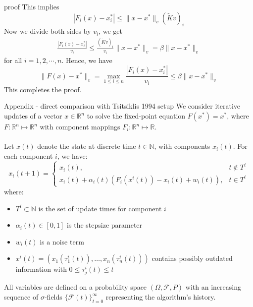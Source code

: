 \documentclass[aspectratio=169]{beamer} %
\begin{document}
\begin{frame}{proof}
This implies
    $$
    |F_i(x)-x^*_i|\le\|x-x^*\|_v(\tilde Kv)_i
    $$
    Now we divide both sides by $v_i$, we get
    \begin{align*}
        \frac{|F_i(x)-x^*_i|}{v_i}\le \frac{(\tilde Kv)_i}{v_i} \|x-x^*\|_v= \beta \|x-x^*\|_v
    \end{align*}
    for all $i=1,2,\cdots, n$. Hence, we have
    $$
    \|F(x)-x^*\|_v = \max_{1\le i \le n}\frac{|F_i(x)-x^*_i|}{v_i} \le\beta \|x-x^*\|_v
    $$
    This completes the proof.
    
\end{frame}
\begin{frame}{Appendix - direct comparison with Tsitsiklis 1994 setup}
    We consider iterative updates of a vector $x \in \mathbb{R}^n$ to solve the fixed-point equation $F(x^*) = x^*$, where $F: \mathbb{R}^n \mapsto \mathbb{R}^n$ with component mappings $F_i: \mathbb{R}^n \mapsto \mathbb{R}$.\\
\\
Let $x(t)$ denote the state at discrete time $t \in \mathbb{N}$, with components $x_i(t)$. For each component $i$, we have:
\begin{equation}\label{eq:update_rule_tsi}
x_i(t + 1) = 
\begin{cases}
x_i(t), & t \notin T^i \\
x_i(t) + \alpha_i(t)(F_i(x^i(t)) - x_i(t) + w_i(t)), & t \in T^i
\end{cases}
\end{equation}
where:
\begin{itemize}
\item $T^i \subset \mathbb{N}$ is the set of update times for component $i$
\item $\alpha_i(t) \in [0,1]$ is the stepsize parameter
\item $w_i(t)$ is a noise term
\item $x^i(t) = (x_1(\tau_1^i(t)), \ldots, x_n(\tau_n^i(t)))$ contains possibly outdated information with $0 \leq \tau_j^i(t) \leq t$
\end{itemize}
All variables are defined on a probability space $(\Omega, \mathcal{F}, P)$ with an increasing sequence of $\sigma$-fields $\{\mathcal{F}(t)\}_{t=0}^{\infty}$ representing the algorithm's history.
\end{frame}
\end{document}
